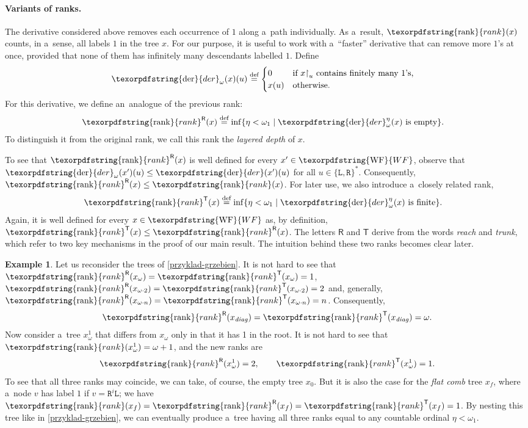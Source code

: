 \documentclass[11pt,a4paper]{amsart}
\theoremstyle{plain}
\theoremstyle{definition}
\newtheorem{exa}[thm]{Example}
\theoremstyle{defC}
\theoremstyle{thmC}
\theoremstyle{plain}
\numberwithin{equation}{section}
\numberwithin{equation}{section}
\numberwithin{figure}{section}
\newcommand{\ident}[1]{\ensuremath{\texorpdfstring{\mathrm{\mathnm{#1}}}{#1}}\xspace}
\newcommand{\eqdef}{\stackrel{\text{def}}=}
\newcommand{\dL}{\mathtt{{\scriptstyle L}}}
\newcommand{\dR}{\mathtt{{\scriptstyle R}}}
\newcommand{\mathnm}[1]{#1}
\newcommand{\restr}{{\upharpoonright}}
\newcommand{\WF}{\ident{WF}}
\newcommand{\der}{\ident{der}}
\newcommand{\sT}{\mathsf{T}}
\newcommand{\sR}{\mathsf{R}}
\newcommand{\rank}{\ident{rank}}
\newcommand{\rankR}{\ident{rank}^\sR}
\newcommand{\rankT}{\ident{rank}^\sT}
\newcommand{\derF}{\der_\omega}
\begin{document}
\paragraph{Variants of ranks.}
The derivative considered above removes each occurrence of $1$ along a~path individually.
As a~result, $\rank(x)$ counts, in a~sense, all labels $1$ in the tree $x$.
For our purpose, it is useful to work with a~``faster'' derivative that can remove more $1$'s at once, provided that none of them has infinitely many descendants labelled $1$.
Define
\begin{align*}
	\derF(x)(u) &\eqdef
	\begin{cases}
	  0	& \text{if $x\restr_u$ contains finitely many $1$'s,} \\
	  x(u)	& \text{otherwise.}
	\end{cases}
\end{align*}
For this derivative, we define an~analogue of the previous rank:
\begin{align*}
	\rankR(x)&\eqdef\inf \{\eta<\omega_1\mid \text{$\derF^\eta(x)$ is empty}\}.
\end{align*}
To distinguish it from the original rank, we call this rank the \emph{layered depth} of $x$.

To see that $\rankR(x)$ is well defined for every $x' \in \WF$, observe that $\derF(x')(u) \leq \der(x')(u)$ for all $u\in\{\dL,\dR\}^\ast$. Consequently, $\rankR(x) \leq \rank(x)$.
For later use, we also introduce a~closely related rank,
\begin{align*}
	\rankT(x)&\eqdef\inf \{\eta<\omega_1\mid \text{$\derF^\eta(x)$ is finite}\}.
\end{align*}
Again, it is well defined for every $x \in \WF$ as, by definition, $\rankT(x) \leq \rankR(x)$.
The letters $\sR$ and $\sT$ derive from the words \emph{reach} and \emph{trunk}, which refer to two key mechanisms in the proof of our main result.
The intuition behind these two ranks becomes clear later.

\begin{exa}
	Let us reconsider the trees of \cref{przyklad-grzebien}.
	It is not hard to see that $\rankR(x_\omega) = \rankT(x_\omega) = 1$, $\rankR(x_{\omega\cdot 2})=\rankT(x_{\omega \cdot 2}) = 2$
	and, generally, $\rankR(x_{\omega\cdot n})=\rankT(x_{\omega \cdot n}) = n$.
	Consequently,
	\[
	\rankR(x_{\mathit{diag}}) =\rankT(x_{\mathit{diag}}) = \omega.
	\]
	Now consider a~tree $x^1_\omega$ that differs from $x_\omega$ only in that it has 1 in the root.
	It is not hard to see that $\rank(x^1_\omega)=\omega + 1$, and the new ranks are
	\[
	  \rankR(x^1_\omega)=2, \qquad \rankT(x^1_\omega)=1.
	\]
	To see that all three ranks may coincide, we can take, of course, the empty tree $x_0$.
	But it is also the case for the \emph{flat comb} tree $x_f$, where a~node $v$ has label $1$ if $v=\dR^i\dL$;
	we have $\rank(x_f) = \rankR(x_f) = \rankT(x_f) = 1$.
	By nesting this tree like in \cref{przyklad-grzebien}, we can eventually produce a~tree having all three ranks equal to any countable ordinal $\eta<\omega_1$.
\end{exa}
\end{document}
